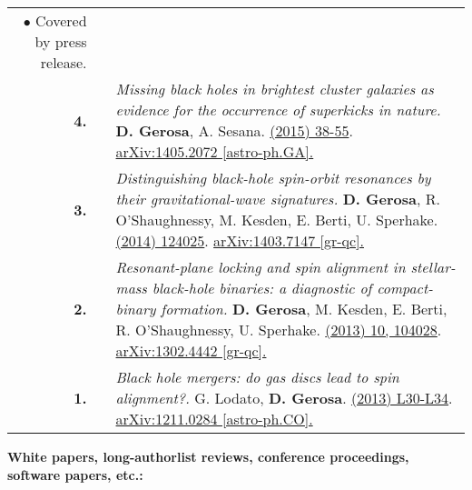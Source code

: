 {\begin{longtable}{rp{0.3cm}p{15.8cm}}
\newline{}
\textcolor{color1}{$\bullet$} Covered by press release.
\vspace{0.09cm}\\
%
\textbf{4.} & & \textit{Missing black holes in brightest cluster galaxies as evidence for the occurrence of superkicks in nature.}
\newline{}
\textbf{D. Gerosa}, A. Sesana.
\newline{}
\href{http://dx.doi.org/10.1093/mnras/stu2049}{\mnras 446 (2015) 38-55}. \href{https://arxiv.org/abs/1405.2072}{arXiv:1405.2072 [astro-ph.GA].}
\vspace{0.09cm}\\
%
\textbf{3.} & & \textit{Distinguishing black-hole spin-orbit resonances by their gravitational-wave signatures.}
\newline{}
\textbf{D. Gerosa}, R. O'Shaughnessy, M. Kesden, E. Berti, U. Sperhake.
\newline{}
\href{http://dx.doi.org/10.1103/PhysRevD.89.124025}{\prd 89 (2014) 124025}. \href{https://arxiv.org/abs/1403.7147}{arXiv:1403.7147 [gr-qc].}
\vspace{0.09cm}\\
%
\textbf{2.} & & \textit{Resonant-plane locking and spin alignment in stellar-mass black-hole binaries: a diagnostic of compact-binary formation.}
\newline{}
\textbf{D. Gerosa}, M. Kesden, E. Berti, R. O'Shaughnessy, U. Sperhake.
\newline{}
\href{http://dx.doi.org/10.1103/PhysRevD.87.104028}{\prd 87 (2013) 10, 104028}. \href{https://arxiv.org/abs/1302.4442}{arXiv:1302.4442 [gr-qc].}
\vspace{0.09cm}\\
%
\textbf{1.} & & \textit{Black hole mergers: do gas discs lead to spin alignment?.}
\newline{}
G. Lodato, \textbf{D. Gerosa}.
\newline{}
\href{http://dx.doi.org/10.1093/mnrasl/sls018}{\mnrasl 429 (2013) L30-L34}. \href{https://arxiv.org/abs/1211.0284}{arXiv:1211.0284 [astro-ph.CO].}
\vspace{0.09cm}\\
%
\end{longtable} }
\textcolor{color1}{\textbf{White papers, long-authorlist reviews, conference proceedings, software papers, etc.:}}
\vspace{-0.5cm}


